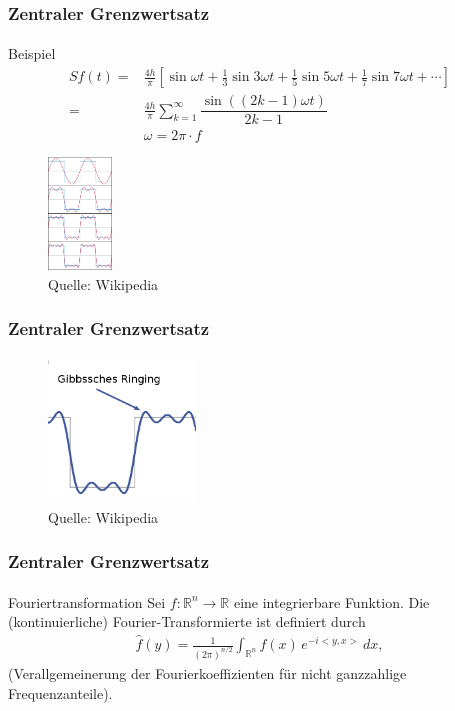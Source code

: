 \documentclass{beamer}
\begin{document}
\begin{frame}
    \frametitle{Zentraler Grenzwertsatz}
\framesubtitle{}

\begin{block}{Beispiel}
\begin{align*}
Sf(t)=& \tfrac{4h}{\pi}\left[\sin \omega t+\tfrac{1}{3}\sin3 \omega t+\tfrac {1}{5}\sin5 \omega t+\tfrac{1}{7}\sin7 \omega t+ \cdots\right]\\
=& \tfrac{4h}{\pi} \sum_{k=1}^\infty \dfrac{ \sin\left( (2k-1)\omega t \right) }{2k-1} \\
& \omega = 2 \pi \cdot f
\end{align*}
\end{block}
\begin{figure}[htp]
      \centering
    \includegraphics[width=0.15\textwidth]{img/fourier_example}
      \caption{Quelle: Wikipedia}
\end{figure}

 \end{frame}



\begin{frame}
    \frametitle{Zentraler Grenzwertsatz}
\framesubtitle{}

\begin{figure}[htp]
      \centering
    \includegraphics[width=0.35\textwidth]{img/Gibb}
      \caption{Quelle: Wikipedia}
\end{figure}

 \end{frame}



\begin{frame}
    \frametitle{Zentraler Grenzwertsatz}
\framesubtitle{}

\begin{block}{Fouriertransformation}
Sei $f: \mathbb{R}^n \to \mathbb{R}$ eine integrierbare Funktion. Die (kontinuierliche) Fourier-Transformierte ist definiert durch
\begin{align*}
\hat{ f}(y) = \frac{1}{\left(2\pi \right)^{n/2}} \int_{\mathbb{R}^n} f(x)\,e^{-i  <y, x>} \, d x,
\end{align*}
(Verallgemeinerung der Fourierkoeffizienten für nicht ganzzahlige Frequenzanteile).
\end{block}

 \end{frame}
\end{document}
